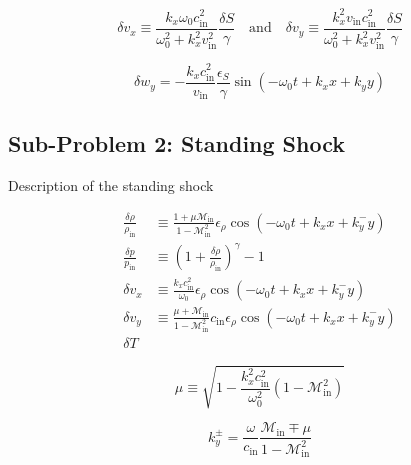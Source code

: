 \begin{equation}
\delta v_x\equiv\frac{k_x\omega_0c_\textrm{in}^2}{\omega_0^2+k_x^2v_\textrm{in}^2}\frac{\delta S}{\gamma} \quad \textrm{and} \quad \delta v_y\equiv\frac{k_x^2v_\textrm{in}c_\textrm{in}^2}{\omega_0^2+k_x^2v_\textrm{in}^2}\frac{\delta S}{\gamma}
\end{equation}

\begin{equation}
\delta w_y=-\frac{k_xc_\textrm{in}^2}{v_\textrm{in}}\frac{\epsilon_S}{\gamma}\sin\left(-\omega_0t+k_xx+k_yy\right)
\end{equation}

\subsection{Sub-Problem 2: Standing Shock}
\label{subsec:sub_problem_2}

Description of the standing shock

\begin{align}
\frac{\delta\rho}{\rho_\textrm{in}}&\equiv\frac{1+\mu\mathcal{M}_\textrm{in}}{1-\mathcal{M}_\textrm{in}^2}\epsilon_\rho\cos\left(-\omega_0t+k_xx+k_y^-y\right) \\
\frac{\delta p}{p_\textrm{in}}&\equiv\left(1+\frac{\delta\rho}{\rho_\textrm{in}}\right)^\gamma-1 \\
\delta v_x&\equiv\frac{k_xc_\textrm{in}^2}{\omega_0}\epsilon_\rho\cos\left(-\omega_0t+k_xx+k_y^-y\right) \\
\delta v_y&\equiv\frac{\mu+\mathcal{M}_\textrm{in}}{1-\mathcal{M}_\textrm{in}^2}c_\textrm{in}\epsilon_\rho\cos\left(-\omega_0t+k_xx+k_y^-y\right) \\
\delta T
\end{align}

\begin{equation}
\mu\equiv\sqrt{1-\frac{k_x^2c_\textrm{in}^2}{\omega_0^2}\left(1-\mathcal{M}_\textrm{in}^2\right)}
\end{equation}

\begin{equation}
k_y^\pm=\frac{\omega}{c_\textrm{in}}\frac{\mathcal{M}_\textrm{in}\mp\mu}{1-\mathcal{M}_\textrm{in}^2}
\end{equation}